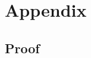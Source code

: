 \documentclass[11pt,twocolumn]{article}
\newcommand{\allocateCapexGeneration}[1][n]{\mathcal{C}^{G}_{#1,t}}
\begin{document}
% 
% 
% 

\newpage
\appendix

\section{Appendix}

\subsection{Proof }
\label{sec:proof_allocate_peer}
\end{document}
